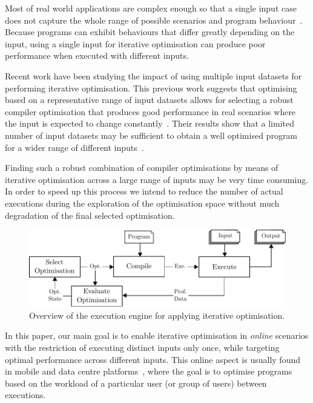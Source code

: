 \documentclass[sigplan,9pt]{acmart}
\begin{document}
Most of real world applications are complex enough 
so that a single input case does not capture the whole
range of possible scenarios and program behaviour~\cite{haneda06,fursin07,chen10,chen12a}.
Because programs can exhibit behaviours that differ greatly depending on the input,
using a single input for iterative optimisation can produce poor performance when executed with different inputs.

Recent work have been studying
the impact of using multiple input datasets
for performing iterative optimisation.
This previous work suggests that optimising based on a representative range of input datasets
allows for selecting a robust compiler optimisation 
that produces good performance in real scenarios where
the input is expected to change constantly~\cite{haneda06,fursin07,chen10,chen12a,chen12b,fang15,mpeis16}.
Their results show that a limited number of input datasets may be sufficient to
obtain a well optimised program for a wider range of different inputs~\cite{haneda06,fursin07,chen10,chen12a}.

Finding such a robust combination of compiler optimisations by means of iterative optimisation across a large range of inputs
may be very time consuming.
In order to speed up this process we intend to reduce the number of actual executions during the exploration
of the optimisation space without much degradation of the final selected optimisation.

\begin{figure}[htb]
    \centering
    \includegraphics[width=\linewidth]{figs/diagram}
    \caption{Overview of the execution engine for applying iterative optimisation.}
    \label{fig:diagram}
\end{figure}

In this paper, our main goal is to enable iterative optimisation in
\textit{online} scenarios with the restriction of executing distinct inputs
only once, while targeting optimal performance across different inputs.
This online aspect is usually found in mobile and data centre
platforms~\cite{chen12b,fang15,mpeis16}, where the goal is to optimise
programs based on the workload of a particular user (or group of users)
between executions.
\end{document}
